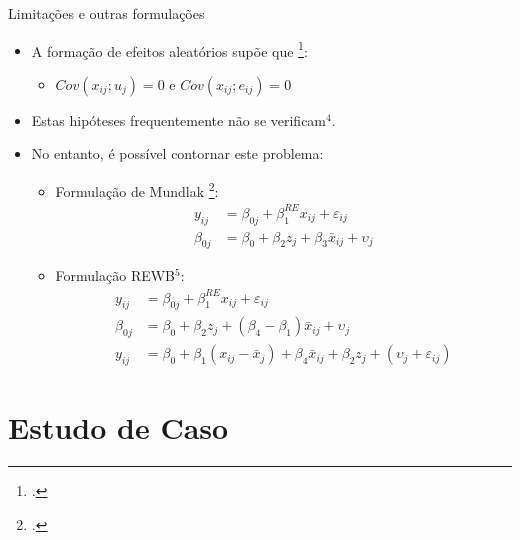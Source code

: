 \documentclass[9pt,ignorenonframetext,aspectratio=169]{beamer}
\providecommand{\tightlist}{%
  \setlength{\itemsep}{0pt}\setlength{\parskip}{0pt}}
\begin{document}
\begin{frame}{Limitações e outras formulações}

\begin{itemize}[<+->]
\tightlist
\item
  \alert<1>{A formação de efeitos aleatórios supõe que \footcite[p. 138]{bell2015}:}

  \begin{itemize}[<+->]
  \tightlist
  \item
    \alert<2>{$Cov(x_{ij}; u_j) = 0$ e $Cov(x_{ij}; e_{ij}) = 0$}
  \end{itemize}
\item
  \alert<3>{Estas hipóteses frequentemente não se verificam$^4$.}
\item
  \alert<4>{No entanto, é possível contornar este problema:}

  \begin{itemize}[<+->]
  \tightlist
  \item
    \alert<5>{Formulação de Mundlak \footcite[p. 141]{bell2015}:
    \begin{align}
    y_{ij} &= \beta_{0j} + \beta_1^{RE}x_{ij} + \varepsilon_{ij}\\
    \beta_{0j} &= \beta_0 + \beta_2 z_j + \beta_3 \bar x_{ij} + \upsilon_j 
    \end{align}
    }
  \item
    \alert<6>{Formulação REWB$^5$:
    \begin{align}
    y_{ij} &= \beta_{0j} + \beta_1^{RE}x_{ij} + \varepsilon_{ij}\\
    \beta_{0j} &= \beta_0 + \beta_2 z_j + (\beta_4 - \beta_1) \bar x_{ij} + \upsilon_j\\ 
    y_{ij} &= \beta_0 + \beta_1 (x_{ij} - \bar x_j) + \beta_4 \bar x_{ij} + \beta_2 z_j + (\upsilon_j + \varepsilon_{ij})
    \end{align}
    }
  \end{itemize}
\end{itemize}

\end{frame}

\hypertarget{estudo-de-caso}{%
\section{Estudo de Caso}\label{estudo-de-caso}}
\end{document}
